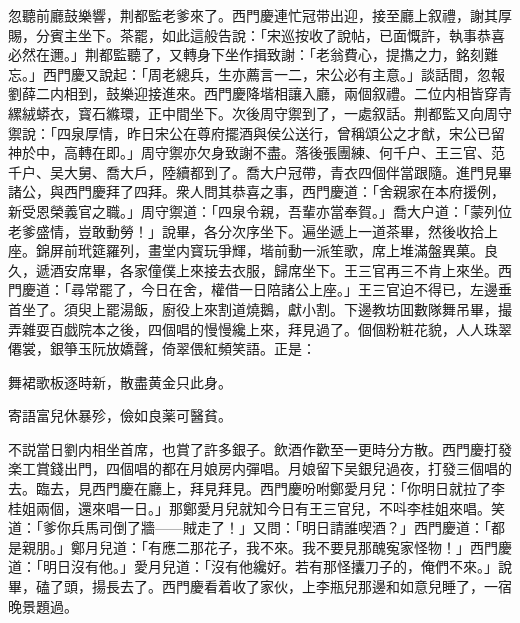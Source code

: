 忽聽前廳鼓樂響，荆都監老爹來了。西門慶連忙冠带出迎，接至廳上叙禮，謝其厚賜，分賓主坐下。茶罷，如此這般告說：「宋巡按收了說帖，已面慨許，執事恭喜必然在邇。」荆都監聽了，又轉身下坐作揖致謝：「老翁費心，提㩦之力，銘刻難忘。」西門慶又說起：「周老總兵，生亦薦言一二，宋公必有主意。」談話間，忽報劉薛二内相到，鼓樂迎接進來。西門慶降堦相讓入廳，兩個叙禮。二位内相皆穿青縲絨蟒衣，寳石縧環，正中間坐下。次後周守禦到了，一處叙話。荆都監又向周守禦說：「四泉厚情，昨日宋公在尊府擺酒與侯公送行，曾稱頌公之才猷，宋公已留神於中，高轉在即。」周守禦亦欠身致謝不盡。落後張團練、何千户、王三官、范千户、吴大舅、喬大戶，陸續都到了。喬大户冠帶，青衣四個伴當跟隨。進門見畢諸公，與西門慶拜了四拜。衆人問其恭喜之事，西門慶道：「舍親家在本府援例，新受恩榮義官之職。」周守禦道：「四泉令親，吾輩亦當奉賀。」喬大户道：「蒙列位老爹盛情，豈敢動勞！」說畢，各分次序坐下。遍坐遞上一道茶畢，然後收拾上座。錦屏前玳筵羅列，畫堂内寳玩爭輝，堦前動一派笙歌，席上堆滿盤異菓。良久，遞酒安席畢，各家僮僕上來接去衣服，歸席坐下。王三官再三不肯上來坐。西門慶道：「尋常罷了，今日在舍，權借一日陪諸公上座。」王三官迫不得已，左邊垂首坐了。須臾上罷湯飯，廚役上來割道燒鵝，獻小割。下邊教坊囬數隊舞吊畢，撮弄雜耍百戯院本之後，四個唱的慢慢纔上來，拜見過了。個個粉粧花貌，人人珠翠僊裳，銀箏玉阮放嬌聲，倚翠偎紅頻笑語。正是：

舞裙歌板逐時新，散盡黄金只此身。

寄語富兒休暴殄，儉如良薬可醫貧。

不説當日劉内相坐首席，也賞了許多銀子。飲酒作歡至一更時分方散。西門慶打發楽工賞錢出門，四個唱的都在月娘房内彈唱。月娘留下吴銀兒過夜，打發三個唱的去。臨去，見西門慶在廳上，拜見拜見。西門慶吩咐鄭愛月兒：「你明日就拉了李桂姐兩個，還來唱一日。」那鄭愛月兒就知今日有王三官兒，不呌李桂姐來唱。笑道：「爹你兵馬司倒了牆——賊走了！」又問：「明日請誰喫酒？」西門慶道：「都是親朋。」鄭月兒道：「有應二那花子，我不來。我不要見那醜寃家怪物！」西門慶道：「明日沒有他。」愛月兒道：「沒有他纔好。若有那怪攮刀子的，俺們不來。」說畢，磕了頭，揚長去了。西門慶看着收了家伙，上李瓶兒那邊和如意兒睡了，一宿晚景題過。

